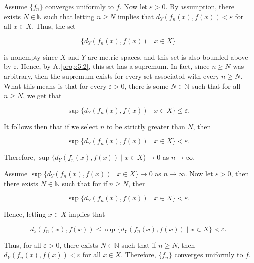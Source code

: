 \documentclass{article}
\makeatletter
\theoremstyle{definition}
\theoremstyle{remark}
\let\oldproofname=\proofname
\renewcommand{\proofname}{\bf{\textit{\oldproofname}}}
\theoremstyle{definition}
\renewenvironment{proof}[1][\proofname]{\par
  \pushQED{\qed}%
  \normalfont \topsep6\p@\@plus6\p@\relax
  \list{}{\leftmargin=0mm
          \rightmargin=0mm
          \settowidth{\itemindent}{\itshape#1}%
          \labelwidth=\itemindent
          \parsep=0pt \listparindent=0mm%
  }
  \item[\hskip\labelsep
        \itshape
    #1\@addpunct{.}]\ignorespaces
}{%
  \popQED\endlist\@endpefalse
}
\makeatother
\begin{document}
\begin{proof}
    Assume $\{f_n\}$ converges uniformly to $f$. Now let $\varepsilon>0$. By assumption, there exists $N\in\mathbb{N}$ such that letting $n\geq N$ implies that $d_Y(f_n(x),f(x))<\varepsilon$ for all $x\in X$. Thus, the set 
    
    \begin{equation*}
        \{d_Y(f_n(x),f(x))\mid x\in X\}
    \end{equation*}
    
    is nonempty since $X$ and $Y$ are metric spaces, and this set is also bounded above by $\varepsilon$. Hence, by A.\ref{prop:5.2}, this set has a supremum. In fact, since $n\geq N$ was arbitrary, then the supremum exists for every set associated with every $n\geq N$. What this means is that for every $\varepsilon>0$, there is some $N\in\mathbb{N}$ such that for all $n\geq N$, we get that 
    
    \begin{equation*}
        \sup\{d_Y(f_n(x),f(x))\mid x\in X\}\leq\varepsilon.
    \end{equation*}
    
    It follows then that if we select $n$ to be strictly greater than $N$, then 
    
    \begin{equation*}
        \sup\{d_Y(f_n(x),f(x))\mid x\in X\}<\varepsilon.
    \end{equation*}
    
    Therefore, $\sup\{d_Y(f_n(x),f(x))\mid x\in X\}\rightarrow0$ as $n\rightarrow\infty$.\par
    \hspace{4mm} Assume $\sup\{d_Y(f_n(x),f(x))\mid x\in X\}\rightarrow0$ as $n\rightarrow\infty$. Now let $\varepsilon>0$, then there exists $N\in\mathbb{N}$ such that for if $n\geq N$, then 
    
    \begin{equation*}
        \sup\{d_Y(f_n(x),f(x))\mid x\in X\}<\varepsilon.
    \end{equation*}
    
    Hence, letting $x\in X$ implies that 
    
    \begin{equation*}
        d_Y(f_n(x),f(x))\leq\sup\{d_Y(f_n(x),f(x))\mid x\in X\}<\varepsilon.
    \end{equation*}
    
    Thus, for all $\varepsilon>0$, there exists $N\in\mathbb{N}$ such that if $n\geq N$, then $d_Y(f_n(x),f(x))<\varepsilon$ for all $x\in X$. Therefore, $\{f_n\}$ converges uniformly to $f$.
\end{proof}
\end{document}
